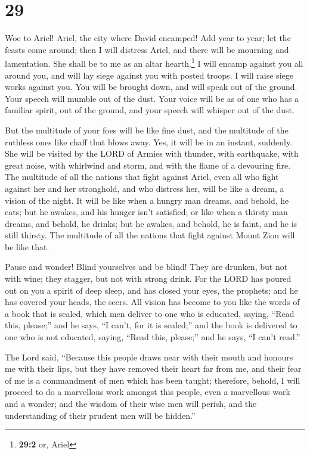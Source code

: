 \hypertarget{section-28}{%
\section{29}\label{section-28}}

 Woe to Ariel! Ariel, the city where David encamped! Add
year to year; let the feasts come around;  then I will
distress Ariel, and there will be mourning and lamentation. She shall be
to me as an altar hearth.\footnote{\textbf{29:2} or, Ariel}
 I will encamp against you all around you, and will lay
siege against you with posted troops. I will raise siege works against
you.  You will be brought down, and will speak out of the
ground. Your speech will mumble out of the dust. Your voice will be as
of one who has a familiar spirit, out of the ground, and your speech
will whisper out of the dust.

 But the multitude of your foes will be like fine dust,
and the multitude of the ruthless ones like chaff that blows away. Yes,
it will be in an instant, suddenly.  She will be visited
by the LORD of Armies with thunder, with earthquake, with great noise,
with whirlwind and storm, and with the flame of a devouring fire.
 The multitude of all the nations that fight against
Ariel, even all who fight against her and her stronghold, and who
distress her, will be like a dream, a vision of the night.
 It will be like when a hungry man dreams, and behold, he
eats; but he awakes, and his hunger isn't satisfied; or like when a
thirsty man dreams, and behold, he drinks; but he awakes, and behold, he
is faint, and he is still thirsty. The multitude of all the nations that
fight against Mount Zion will be like that.

 Pause and wonder! Blind yourselves and be blind! They are
drunken, but not with wine; they stagger, but not with strong drink.
 For the LORD has poured out on you a spirit of deep
sleep, and has closed your eyes, the prophets; and he has covered your
heads, the seers.  All vision has become to you like the
words of a book that is sealed, which men deliver to one who is
educated, saying, ``Read this, please;'' and he says, ``I can't, for it
is sealed;''  and the book is delivered to one who is not
educated, saying, ``Read this, please;'' and he says, ``I can't read.''

 The Lord said, ``Because this people draws near with
their mouth and honours me with their lips, but they have removed their
heart far from me, and their fear of me is a commandment of men which
has been taught;  therefore, behold, I will proceed to do
a marvellous work amongst this people, even a marvellous work and a
wonder; and the wisdom of their wise men will perish, and the
understanding of their prudent men will be hidden.''

